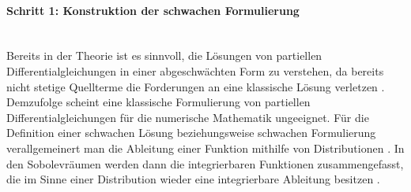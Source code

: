 \documentclass[crop=false]{standalone}
\begin{document}
      \paragraph{Schritt 1: Konstruktion der schwachen Formulierung} %
      \label{par:schritt_1_konstruktion_der_schwachen_formulierung}
        \hfill\\
        Bereits in der Theorie ist es sinnvoll, die Lösungen von partiellen Differentialgleichungen in einer abgeschwächten Form zu verstehen, da bereits nicht stetige Quellterme die Forderungen an eine klassische Lösung verletzen \cite[S.~46]{Schweizer2013}.
        Demzufolge scheint eine klassische Formulierung von partiellen Differentialgleichungen für die numerische Mathematik ungeeignet.
        Für die Definition einer schwachen Lösung beziehungsweise schwachen Formulierung verallgemeinert man die Ableitung einer Funktion mithilfe von Distributionen \cite[S.~46~ff]{Schweizer2013}.
        In den Sobolevräumen werden dann die integrierbaren Funktionen zusammengefasst, die im Sinne einer Distribution wieder eine integrierbare Ableitung besitzen \cite[S.~54~ff]{Schweizer2013}.
\end{document}
